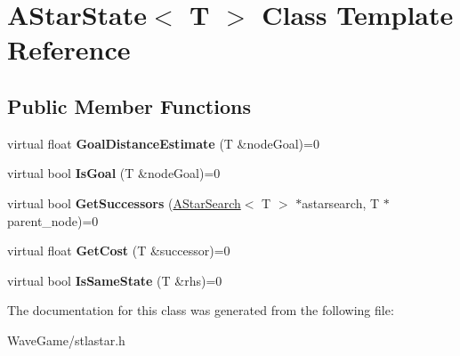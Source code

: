 \hypertarget{class_a_star_state}{}\section{A\+Star\+State$<$ T $>$ Class Template Reference}
\label{class_a_star_state}
\subsection*{Public Member Functions}
\begin{DoxyCompactItemize}
\item 
\mbox{\label{class_a_star_state_a1dcdf082c6a6080e1a4b397a562c539d}} 
virtual float {\bfseries Goal\+Distance\+Estimate} (T \&node\+Goal)=0
\item 
\mbox{\label{class_a_star_state_abbf2e2688bc9a0bb9e0edce0704f6be0}} 
virtual bool {\bfseries Is\+Goal} (T \&node\+Goal)=0
\item 
\mbox{\label{class_a_star_state_a400c110ac749360753a1a2dea60775ea}} 
virtual bool {\bfseries Get\+Successors} (\hyperlink{class_a_star_search}{A\+Star\+Search}$<$ T $>$ $\ast$astarsearch, T $\ast$parent\+\_\+node)=0
\item 
\mbox{\label{class_a_star_state_aac09dede5e82beabac38dac656a2c635}} 
virtual float {\bfseries Get\+Cost} (T \&successor)=0
\item 
\mbox{\label{class_a_star_state_a4371325fcc1bc6901002f4b8edbac682}} 
virtual bool {\bfseries Is\+Same\+State} (T \&rhs)=0
\end{DoxyCompactItemize}


The documentation for this class was generated from the following file\+:\begin{DoxyCompactItemize}
\item 
Wave\+Game/stlastar.\+h\end{DoxyCompactItemize}
